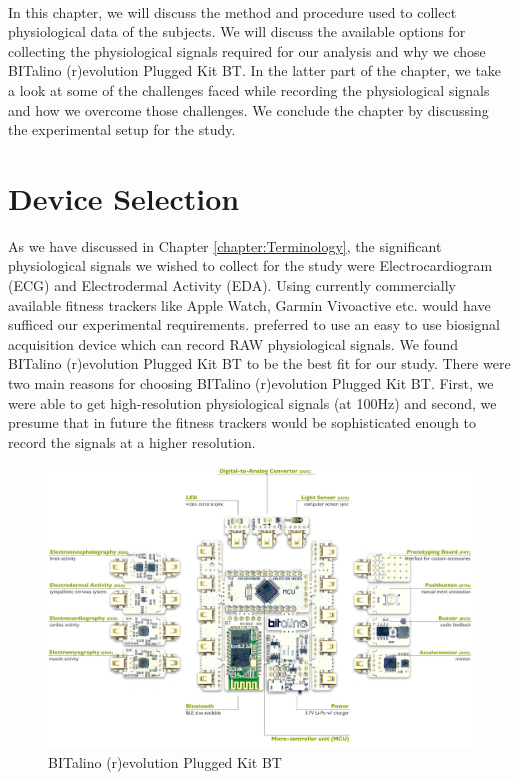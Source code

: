 \label{chapter:data_collection}
\paragraph{}
In this chapter, we will discuss the method and procedure used to collect physiological data of the subjects. We will discuss the available options for collecting the physiological signals required for our analysis and why we chose BITalino (r)evolution Plugged Kit BT. In the latter part of the chapter, we take a look at some of the challenges faced while recording the physiological signals and how we overcome those challenges. We conclude the chapter by discussing the experimental setup for the study.
\section{Device Selection}
As we have discussed in Chapter \ref{chapter:Terminology}, the significant physiological signals we wished to collect for the study were Electrocardiogram (ECG) and Electrodermal Activity (EDA). Using currently commercially available fitness trackers like Apple Watch, Garmin Vivoactive etc. would have sufficed our experimental requirements. preferred to use an easy to use biosignal acquisition device which can record RAW physiological signals. We found BITalino (r)evolution Plugged Kit BT to be the best fit for our study. There were two main reasons for choosing BITalino (r)evolution Plugged Kit BT. First, we were able to get high-resolution physiological signals (at 100Hz) and second, we presume that in future the fitness trackers would be sophisticated enough to record the signals at a higher resolution.
\begin{figure}
\centering
\includegraphics[width=150mm]{Figures/bitalino.jpg}
\caption{BITalino (r)evolution Plugged Kit BT \cite{bitalino_datasheet}}
\label{fig:bitalino}
\end{figure}
